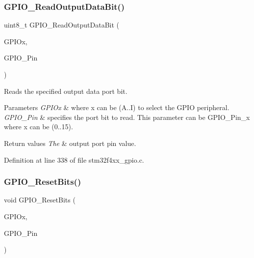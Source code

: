 \mbox{\label{group___g_p_i_o_ga138270f8695b105b7c6ed405792919c1}} 
\subsubsection{\texorpdfstring{G\+P\+I\+O\+\_\+\+Read\+Output\+Data\+Bit()}{GPIO\_ReadOutputDataBit()}}
{\footnotesize\ttfamily uint8\+\_\+t G\+P\+I\+O\+\_\+\+Read\+Output\+Data\+Bit (\begin{DoxyParamCaption}\item[{\hyperlink{struct_g_p_i_o___type_def}{G\+P\+I\+O\+\_\+\+Type\+Def} $\ast$}]{G\+P\+I\+Ox,  }\item[{uint16\+\_\+t}]{G\+P\+I\+O\+\_\+\+Pin }\end{DoxyParamCaption})}



Reads the specified output data port bit. 


\begin{DoxyParams}{Parameters}
{\em G\+P\+I\+Ox} & where x can be (A..I) to select the G\+P\+IO peripheral. \\
\hline
{\em G\+P\+I\+O\+\_\+\+Pin} & specifies the port bit to read. This parameter can be G\+P\+I\+O\+\_\+\+Pin\+\_\+x where x can be (0..15). \\
\hline
\end{DoxyParams}

\begin{DoxyRetVals}{Return values}
{\em The} & output port pin value. \\
\hline
\end{DoxyRetVals}


Definition at line 338 of file stm32f4xx\+\_\+gpio.\+c.

\mbox{\label{group___g_p_i_o_ga6fcd35b207a66608dd2c9d7de9247dc8}} 
\subsubsection{\texorpdfstring{G\+P\+I\+O\+\_\+\+Reset\+Bits()}{GPIO\_ResetBits()}}
{\footnotesize\ttfamily void G\+P\+I\+O\+\_\+\+Reset\+Bits (\begin{DoxyParamCaption}\item[{\hyperlink{struct_g_p_i_o___type_def}{G\+P\+I\+O\+\_\+\+Type\+Def} $\ast$}]{G\+P\+I\+Ox,  }\item[{uint16\+\_\+t}]{G\+P\+I\+O\+\_\+\+Pin }\end{DoxyParamCaption})}



